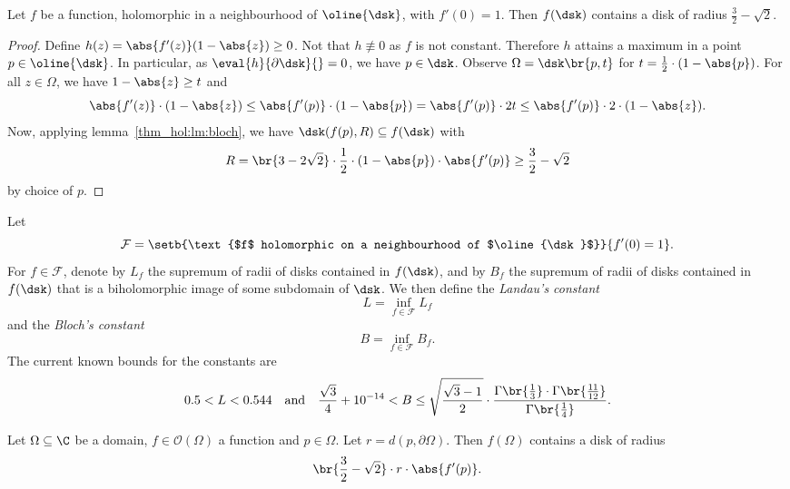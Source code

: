 \begin{izrek}[Bloch]
Let $f$ be a function, holomorphic in a neighbourhood of
$\oline{\dsk}$, with $f'(0) = 1$. Then $f(\dsk)$ contains a disk of
radius $\frac{3}{2} - \sqrt{2}$.
\end{izrek}


\begin{proof}
Define $h(z) = \abs{f'(z)} (1-\abs{z}) \geq 0$. Not that
$h \not \equiv 0$ as $f$ is not constant. Therefore $h$ attains a
maximum in a point $p \in \oline{\dsk}$. In particular, as
$\eval{h}{\partial \dsk}{} = 0$, we have $p \in \dsk$. Observe
$\Omega = \dsk \br{p, t}$ for
$t = \frac{1}{2} \cdot (1 - \abs{p})$.
For all $z \in \Omega$, we have $1 - \abs{z} \geq t$ and
\[
\abs{f'(z)} \cdot (1 - \abs{z}) \leq
\abs{f'(p)} \cdot (1 - \abs{p}) =
\abs{f'(p)} \cdot 2t \leq
\abs{f'(p)} \cdot 2 \cdot (1 - \abs{z}).
\]
Now, applying lemma~\ref{thm_hol:lm:bloch}, we have
$\dsk(f(p), R) \subseteq f(\dsk)$ with
\[
R =
\br{3 - 2 \sqrt{2}} \cdot \frac{1}{2}
\cdot (1 - \abs{p}) \cdot \abs{f'(p)} \geq
\frac{3}{2} - \sqrt{2}
\]
by choice of $p$.
\end{proof}

\begin{opomba}
Let
\[
\mathcal{F} =
\setb{\text{$f$ holomorphic on a neighbourhood of $\oline{\dsk}$}}
{f'(0) = 1}.
\]
For $f \in \mathcal{F}$, denote by $L_f$ the supremum of radii of
disks contained in $f(\dsk)$, and by $B_f$ the supremum of radii of
disks contained in $f(\dsk)$ that is a biholomorphic image of some
subdomain of $\dsk$. We then define the \emph{Landau's constant}
\[
L = \inf_{f \in \mathcal{F}} L_f
\]
and the \emph{Bloch's constant}
\[
B = \inf_{f \in \mathcal{F}} B_f.
\]
The current known bounds for the constants are
\[
0.5 < L < 0.544
\quad \text{and} \quad
\frac{\sqrt{3}}{4} + 10^{-14} < B \leq
\sqrt{\frac{\sqrt{3} - 1}{2}} \cdot
\frac{\Gamma \br{\frac{1}{3}} \cdot \Gamma \br{\frac{11}{12}}}
{\Gamma \br{\frac{1}{4}}}.
\]
\end{opomba}

\begin{posledica}
\label{thm_hol:cor:bloch}
Let $\Omega \subseteq \C$ be a domain, $f \in \mathcal{O}(\Omega)$
a function and $p \in \Omega$. Let $r = d(p, \partial \Omega)$.
Then $f(\Omega)$ contains a disk of radius
\[
\br{\frac{3}{2} - \sqrt{2}} \cdot r \cdot \abs{f'(p)}.
\]
\end{posledica}

\obvs

